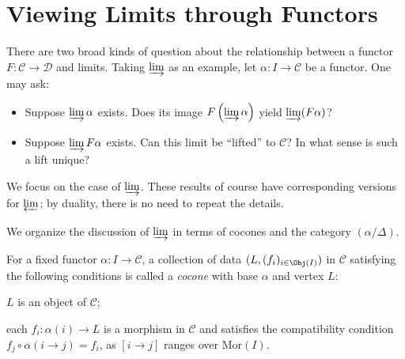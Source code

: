 
\section{Viewing Limits through Functors}\label{sec:limit-functor}
\hypertarget{o014.aljabr2.chapter1.limits-through-functors}{ }

There are two broad kinds of question about the relationship between a functor
$F: \mathcal{C} \to \mathcal{D}$ and limits. Taking $\varinjlim$ as an
example, let $\alpha: I \to \mathcal{C}$ be a functor. One may ask:
\begin{itemize}
	\item Suppose $\varinjlim \alpha$ exists. Does its image
	$F\left(\varinjlim \alpha\right)$ yield $\varinjlim (F\alpha)$?
	\item Suppose $\varinjlim F\alpha$ exists. Can this limit be ``lifted'' to
	$\mathcal{C}$? In what sense is such a lift unique?
\end{itemize}

We focus on the case of $\varinjlim$. These results of course have
corresponding versions for $\varprojlim$; by duality, there is no need to
repeat the details.

We organize the discussion of $\varinjlim$ in terms of cocones and the category
$(\alpha/\Delta)$.

\begin{convention}\label{con:limit-cone}
	For a fixed functor $\alpha: I \to \mathcal{C}$, a collection of data
	$(L, (f_i)_{i \in \Obj(I)})$ in $\mathcal{C}$ satisfying the following
	conditions is called a \emph{cocone} with base $\alpha$ and vertex $L$:
	\begin{compactitem}
		\item $L$ is an object of $\mathcal{C}$;
		\item each $f_i : \alpha(i) \to L$ is a morphism in $\mathcal{C}$ and
		satisfies the compatibility condition
		$f_j \circ \alpha(i \to j) = f_i$, as $[i \to j]$ ranges over
		$\mathrm{Mor}(I)$.
	\end{compactitem}
\end{convention}

